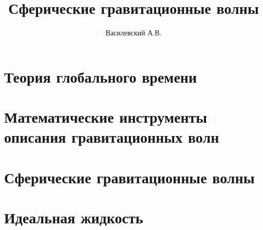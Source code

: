 \documentclass[12pt,a4paper]{article}
\title{Сферические гравитационные волны}
\author{Василевский А.В.}
\providecommand{\docroot}{../..}
\begin{document}
    \makedocroot

    \maketitle
    \tableofcontents

    \section{Теория глобального времени}
    

    \section{Математические инструменты описания гравитационных волн}
    

    \section{Сферические гравитационные волны}
    

    \section{Идеальная жидкость}
    
\end{document}
